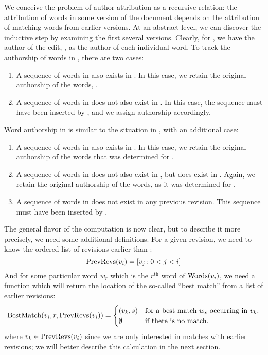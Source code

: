 We conceive the problem of author attribution as a recursive relation:
the attribution of words in some version of the document depends on the
attribution of matching words from earlier versions.
At an abstract level, we can discover the inductive step by examining
the first several versions.
Clearly, for , we have the author of the edit,
, as the author of each individual word.
To track the authorship of words in , there are two cases:
\begin{enumerate}
\item A sequence of words in  also exists in .
	In this case, we retain the original authorship of the words,
	.
\item A sequence of words in  does not also exist in .
	In this case, the sequence must have been inserted by
	, and we assign authorship accordingly.
\end{enumerate}
Word authorship in  is similar to the situation in
, with an additional case:
\begin{enumerate}
\item A sequence of words in  also exists in .
	In this case, we retain the original authorship of the words
	that was determined for .
\item A sequence of words in  does not also exist in ,
	but does exist in .
	Again, we retain the original authorship of the words, as it was
	determined for .
\item A sequence of words in  does not exist in any previous
	revision.
	This sequence must have been inserted by .
\end{enumerate}

The general flavor of the computation is now clear, but to describe it
more precisely, we need some additional definitions.
For a given revision, we need to know the ordered list of revisions
earlier than :
\begin{equation}
    \prevrevs{\version{i}} = \left[ \version{j} \colon  0 < j < i \right]
\label{def:prevrevs}
\end{equation}
And for some particular
word $w_r$ which is the $r^{\text{th}}$ word of $\mathrm{Words}(v_{i})$,
we need a function which will return the location of the so-called
``best match'' from a list of earlier revisions:
\begin{equation}
    \match{\version{i}, r, \prevrevs{\version{i}}} =
    \begin{cases}
	(\version{k}, s) & \text{for a best match $w_s$ occurring in \version{k}.} \\
	\emptyset & \text{if there is no match.} \\
    \end{cases}
\label{def:bestmatch}
\end{equation}
where $v_{k} \in \mathrm{PrevRevs}(v_{i})$ since we are only
interested in matches with earlier revisions; we will better describe
this calculation in the next section.

